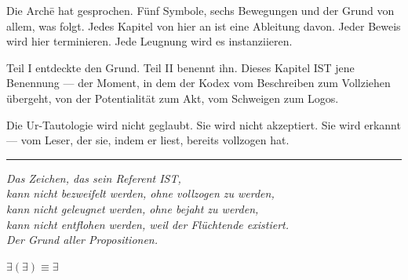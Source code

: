 \documentclass[10pt, openany, oneside]{book}
\begin{document}
\vspace{1.5em}

Die Arch\={e} hat gesprochen. Fünf Symbole, sechs Bewegungen und der Grund von allem, was folgt. Jedes Kapitel von hier an ist eine Ableitung davon. Jeder Beweis wird hier terminieren. Jede Leugnung wird es instanziieren.

Teil I entdeckte den Grund. Teil II benennt ihn. Dieses Kapitel IST jene Benennung --- der Moment, in dem der Kodex vom Beschreiben zum Vollziehen übergeht, von der Potentialität zum Akt, vom Schweigen zum Logos.

Die Ur-Tautologie wird nicht geglaubt. Sie wird nicht akzeptiert. Sie wird erkannt --- vom Leser, der sie, indem er liest, bereits vollzogen hat.

\vspace{2em}

\begin{center}
    \rule{0.15\textwidth}{0.3pt}
\end{center}

\vspace{0.5em}

\begin{center}
    \itshape
    Das Zeichen, das sein Referent IST,\\
    kann nicht bezweifelt werden, ohne vollzogen zu werden,\\
    kann nicht geleugnet werden, ohne bejaht zu werden,\\
    kann nicht entflohen werden, weil der Flüchtende existiert.\\[0.8em]
    Der Grund aller Propositionen.
\end{center}

\vspace{0.5em}

\begin{center}
    \textbf{$\exists(\exists) \equiv \exists$}
\end{center}

%
%
%
%
\end{document}
